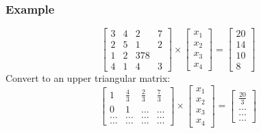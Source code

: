 \documentclass{math}
\begin{document}
\subsubsection*{Example}
\[ \begin{bmatrix}
  3 & 4 & 2 & 7 \\
  2 & 5 & 1 & 2 \\
  1 & 2 & 3 7 8 \\
  4 & 1 & 4 & 3
\end{bmatrix}\times\begin{bmatrix}
  x_1 \\ x_2 \\ x_3 \\ x_4
\end{bmatrix} = \begin{bmatrix}
  20 \\ 14 \\ 10 \\ 8
\end{bmatrix} \]
Convert to an upper triangular matrix:
\[ \begin{bmatrix}
  1 & \frac{4}{3} & \frac{2}{3} & \frac{7}{3} \\
  0 & 1 & \dots & \dots \\
  \dots & \dots & \dots & \dots \\
  \dots & \dots & \dots & \dots
\end{bmatrix}\times\begin{bmatrix}
  x_1 \\ x_2 \\ x_3 \\ x_4
\end{bmatrix} = \begin{bmatrix}
  \frac{20}{3} \\ \dots \\ \dots \\ \dots
\end{bmatrix} \]
\end{document}
